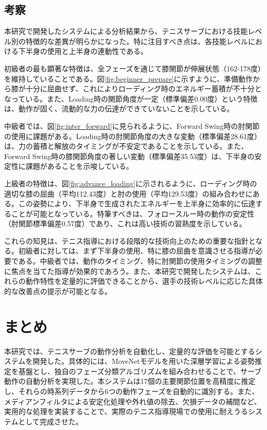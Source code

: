 \documentclass[oneside]{suribt}[11pt]
\begin{document}
\section{考察}
本研究で開発したシステムによる分析結果から、テニスサーブにおける技能レベル別の特徴的な差異が明らかになった。特に注目すべき点は、各技能レベルにおける下半身の使用と上半身の連動性である。

初級者の最も顕著な特徴は、全フェーズを通じて膝関節が伸展状態（162-178度）を維持していることである。図\ref{fig:beginner_prepare}に示すように、準備動作から膝が十分に屈曲せず、これによりローディング時のエネルギー蓄積が不十分となっている。また、Loading時の関節角度が一定（標準偏差0.00度）という特徴は、動作が固く、流動的な力の伝達ができていないことを示している。

中級者では、図\ref{fig:inter_forward}に見られるように、Forward Swing時の肘関節の使用に課題がある。Loading時の肘関節角度の大きな変動（標準偏差28.61度）は、力の蓄積と解放のタイミングが不安定であることを示している。また、Forward Swing時の膝関節角度の著しい変動（標準偏差35.53度）は、下半身の安定性に課題があることを示唆している。

上級者の特徴は、図\ref{fig:advance_loading}に示されるように、ローディング時の適切な膝の屈曲（平均112.43度）と肘の使用（平均129.53度）の組み合わせにある。この姿勢により、下半身で生成されたエネルギーを上半身に効率的に伝達することが可能となっている。特筆すべきは、フォロースルー時の動作の安定性（肘関節標準偏差0.57度）であり、これは高い技術の習熟度を示している。

これらの知見は、テニス指導における段階的な技術向上のための重要な指針となる。初級者に対しては、まず下半身の使用、特に膝の屈曲を意識させる指導が必要である。中級者では、動作のタイミング、特に肘関節の使用タイミングの調整に焦点を当てた指導が効果的であろう。また、本研究で開発したシステムは、これらの動作特性を定量的に評価できることから、選手の技術レベルに応じた具体的な改善点の提示が可能となる。

\chapter{まとめ}

本研究では、テニスサーブの動作分析を自動化し、定量的な評価を可能とするシステムを開発した。具体的には、MoveNetモデルを用いた深層学習による姿勢推定を基盤とし、独自のフェーズ分類アルゴリズムを組み合わせることで、サーブ動作の自動分析を実現した。本システムは17個の主要関節位置を高精度に推定し、それらの時系列データから6つの動作フェーズを自動的に識別する。また、メディアンフィルタによる安定化処理や外れ値の除去、欠損データの補間など、実用的な処理を実装することで、実際のテニス指導現場での使用に耐えうるシステムとして完成させた。
\end{document}
